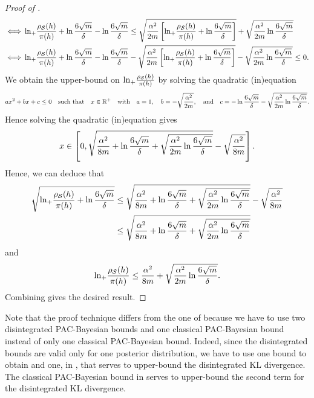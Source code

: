 \documentclass[twoside]{article}
\theoremstyle{plain}
\begin{document}
\begin{proof}[Proof of ]
\begin{align*}
\iff &\ln_{+}\!\frac{\rho_{\mathcal{S}}(h)}{\pi(h)} + \ln\frac{6\sqrt{m}}{\delta} - \ln\frac{6\sqrt{m}}{\delta} \le \sqrt{\frac{\alpha^2}{2m}\left[\ln_{+}\!\frac{\rho_{\mathcal{S}}(h)}{\pi(h)} + \ln\frac{6\sqrt{m}}{\delta}\right]} + \sqrt{\frac{\alpha^2}{2m}\ln\frac{6\sqrt{m}}{\delta}}\\
\iff &\ln_{+}\!\frac{\rho_{\mathcal{S}}(h)}{\pi(h)} + \ln\frac{6\sqrt{m}}{\delta} - \ln\frac{6\sqrt{m}}{\delta} - \sqrt{\frac{\alpha^2}{2m}\left[\ln_{+}\!\frac{\rho_{\mathcal{S}}(h)}{\pi(h)} + \ln\frac{6\sqrt{m}}{\delta}\right]} - \sqrt{\frac{\alpha^2}{2m}\ln\frac{6\sqrt{m}}{\delta}} \le 0.
\end{align*}
We obtain the upper-bound on $\ln_{+}\!\frac{\rho_{\mathcal{S}}(h)}{\pi(h)}$ by solving the quadratic (in)equation
\begin{align*}
ax^2+bx+c \le 0 \quad\text{such that}\quad x\in\mathbb{R}^{+} \quad\text{with}\quad a=1, \quad b=-\sqrt{\frac{\alpha^2}{2m}}, \quad\text{and}\quad c=-\ln\frac{6\sqrt{m}}{\delta}-\sqrt{\frac{\alpha^2}{2m}\ln\frac{6\sqrt{m}}{\delta}}.
\end{align*}
Hence solving the quadratic (in)equation gives 
\begin{align*}
x \in \left[ 0, \sqrt{\frac{\alpha^2}{8m}+\ln\frac{6\sqrt{m}}{\delta}+ \sqrt{\frac{\alpha^2}{2m}\ln\frac{6\sqrt{m}}{\delta}}}-\sqrt{\frac{\alpha^2}{8m}}\right].
\end{align*}
Hence, we can deduce that  
\begin{align*}
\sqrt{\ln_{+}\!\frac{\rho_{\mathcal{S}}(h)}{\pi(h)} + \ln\frac{6\sqrt{m}}{\delta}} &\le \sqrt{\frac{\alpha^2}{8m}+\ln\frac{6\sqrt{m}}{\delta}+ \sqrt{\frac{\alpha^2}{2m}\ln\frac{6\sqrt{m}}{\delta}}}-\sqrt{\frac{\alpha^2}{8m}}\\
&\le \sqrt{\frac{\alpha^2}{8m}+\ln\frac{6\sqrt{m}}{\delta}+ \sqrt{\frac{\alpha^2}{2m}\ln\frac{6\sqrt{m}}{\delta}}}
\end{align*}
and
\begin{align}
\ln_{+}\!\frac{\rho_{\mathcal{S}}(h)}{\pi(h)} \le \frac{\alpha^2}{8m} + \sqrt{\frac{\alpha^2}{2m}\ln\frac{6\sqrt{m}}{\delta}}.\label{eq:proof-dis-kl-lever-risk-5}
\end{align}
Combining  gives the desired result.
\end{proof}

Note that the proof technique differs from the one of \citet{lever2013tighter} because we have to use two disintegrated PAC-Bayesian bounds and one classical PAC-Bayesian bound instead of only one classical PAC-Bayesian bound.
Indeed, since the disintegrated bounds are valid only for one posterior distribution, we have to use one bound to obtain  and one, in , that serves to upper-bound the disintegrated KL divergence.
The classical PAC-Bayesian bound in  serves to upper-bound the second term for the disintegrated KL divergence. 
\end{document}
